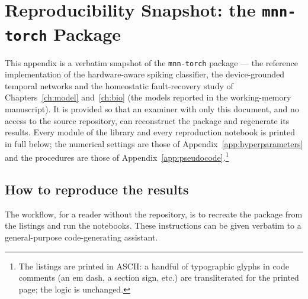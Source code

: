 \chapter{Reproducibility Snapshot: the \texttt{mnn-torch} Package}
\label{app:code}

\noindent This appendix is a verbatim snapshot of the \texttt{mnn-torch}
package --- the reference implementation of the hardware-aware spiking classifier, the
device-grounded temporal networks and the homeostatic fault-recovery study of
Chapters~\ref{ch:model} and~\ref{ch:bio} (the models reported in the 
working-memory manuscript). It is provided so that an examiner with only this document,
and no access to the source repository, can reconstruct the package and regenerate its
results. Every module of the library and every reproduction notebook is printed in full
below; the numerical settings are those of Appendix~\ref{app:hyperparameters} and the
procedures are those of Appendix~\ref{app:pseudocode}.\footnote{The listings are printed
in ASCII: a handful of typographic glyphs in code comments (an em dash, a section sign,
etc.) are transliterated for the printed page; the logic is unchanged.}

\section{How to reproduce the results}
\label{app:mnn-howto}

\noindent The workflow, for a reader without the repository, is to recreate the package
from the listings and run the notebooks. These instructions can be given verbatim to a
general-purpose code-generating assistant.

